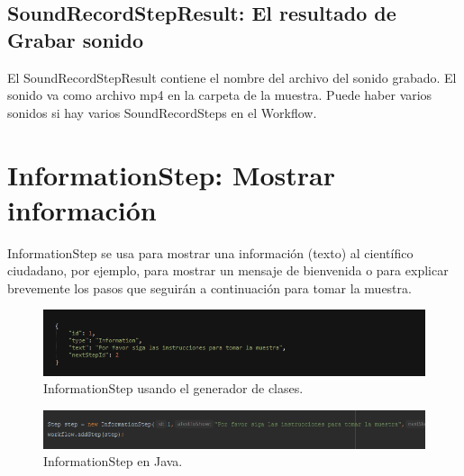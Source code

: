 \subsection{SoundRecordStepResult: El resultado de Grabar sonido}
El SoundRecordStepResult contiene el nombre del archivo del sonido grabado. El sonido va como archivo mp4 en la carpeta de la muestra.
Puede haber varios sonidos si hay varios SoundRecordSteps en el Workflow.



\section{InformationStep: Mostrar información}
InformationStep se usa para mostrar una información (texto) al científico ciudadano, por ejemplo, para mostrar un mensaje de bienvenida o para explicar brevemente los pasos que seguirán a continuación para tomar la muestra.


\begin{figure}[H]
  \centering
    \includegraphics[scale=0.6]{50-anexos/C-steps/information_json.png} 
    \caption{InformationStep usando el generador de clases.}
\end{figure}	

\begin{figure}[H]
  \centering
    \includegraphics[scale=0.6]{50-anexos/C-steps/information_java.png} 
    \caption{InformationStep en Java.}
\end{figure}


